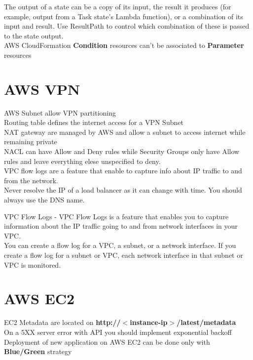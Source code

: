\documentclass[12pt, letterpaper, twoside]{article}
\begin{document}
The output of a state can be a copy of its input, the result it produces (for example, output from a 
Task state’s Lambda function), or a combination of its input and result. Use ResultPath to control 
which combination of these is passed to the state output.\\

AWS CloudFormation \textbf{Condition} resources can't be associated to \textbf{Parameter} resources

\section{AWS VPN}
AWS Subnet allow VPN partitioning\\
Routing table defines the internet access for a VPN Subnet\\

NAT gateway are managed by AWS and allow a subnet to access internet while remaining private\\
NACL can have Allow and Deny rules while Security Groups only have Allow rules and leave everything 
elese unspecified to deny.\\

VPC flow logs are a feature that enable to capture info about IP traffic to and from the network.\\

Never resolve the IP of a load balancer as it can change with time. You should always use the DNS name.

VPC Flow Logs - VPC Flow Logs is a feature that enables you to capture information about the IP traffic going 
to and from network interfaces in your VPC.\\
You can create a flow log for a VPC, a subnet, or a network interface. If you create a flow log for a subnet or 
VPC, each network interface in that subnet or VPC is monitored.\\



\section{AWS EC2}
EC2 Metadata are located on \textbf{http://$<$instance-ip$>$/latest/metadata}\\
On a 5XX server error with API you should implement exponential backoff\\

Deployment of new application on AWS EC2 can be done only with \textbf{Blue/Green} strategy\\
\end{document}
